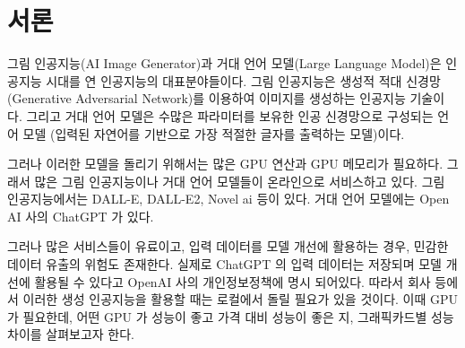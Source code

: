 \section{서론}
그림 인공지능(AI Image Generator)과 거대 언어 모델(Large Language Model)은 인공지능
시대를 연 인공지능의 대표분야들이다. 그림 인공지능은 생성적 적대 신경망(Generative 
Adversarial Network)를 이용하여 이미지를 생성하는 인공지능 기술이다. 그리고 거대 언어
모델은 수많은 파라미터를 보유한 인공 신경망으로 구성되는 언어 모델\cite{wiki:llm} (입력된
자연어를 기반으로 가장 적절한 글자를 출력하는 모델)이다.

그러나 이러한 모델을 돌리기 위해서는 많은 GPU 연산과 GPU 메모리가 필요하다. 그래서
많은 그림 인공지능이나 거대 언어 모델들이 온라인으로 서비스하고 있다. 그림
인공지능에서는 DALL-E\cite{ramesh2021zeroshot}, DALL-E2\cite{ramesh2022hierarchical}, Novel ai\cite{novelAIDocu} 등이 있다. 거대 언어 모델에는 Open 
AI 사의 ChatGPT 가 있다.

그러나 많은 서비스들이 유료이고, 입력 데이터를 모델 개선에 활용하는 경우, 민감한
데이터 유출의 위험도 존재한다. 실제로 ChatGPT 의 입력 데이터는 저장되며 모델 개선에
활용될 수 있다고 OpenAI 사의 개인정보정책에 명시 되어있다\cite{kisa2023chatgpt}. 따라서 회사 등에서
이러한 생성 인공지능을 활용할 때는 로컬에서 돌릴 필요가 있을 것이다. 이때 GPU 가
필요한데, 어떤 GPU 가 성능이 좋고 가격 대비 성능이 좋은 지, 그래픽카드별 성능차이를
살펴보고자 한다.

